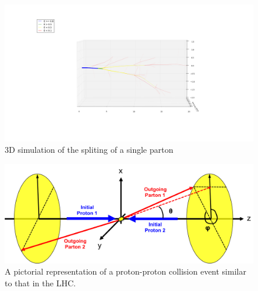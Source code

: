 %
%
% 
\begin{figure}[H]
\centering
\includegraphics[scale=.3]{images/3D_partonshower.png}
\caption{3D simulation of the spliting of a single parton}\label{fig:3dparton}
\end{figure}

\begin{figure}[hbtp]
\centering
\includegraphics[scale=.3]{images/twoparticles.png}
\caption{A pictorial representation of a proton-proton collision event similar to that in the LHC.}\label{fig:twopartons}
\end{figure}
